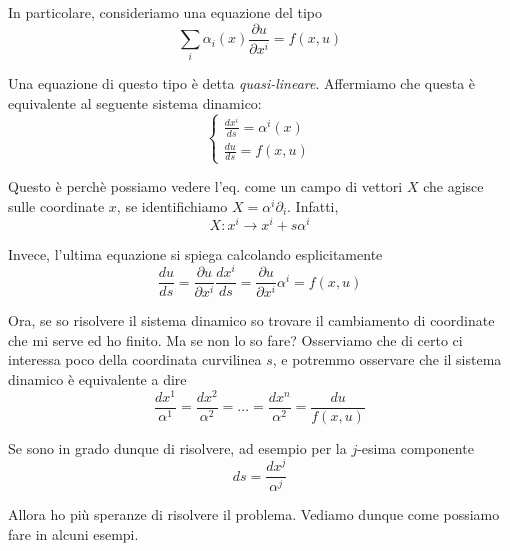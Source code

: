 \documentclass{report}
\begin{document}
In particolare, consideriamo una equazione del tipo 
\begin{equation}
    \sum_i \alpha_i(x)\frac{\partial u}{\partial x^i} = f(x, u)
\end{equation}

Una equazione di questo tipo è detta \emph{quasi-lineare}. Affermiamo che questa è equivalente al seguente sistema dinamico: 
\[\begin{cases}
    \frac{dx^i}{ds} = \alpha^i(x) \\ \frac{du}{ds} = f(x, u)
\end{cases}\]

Questo è perchè possiamo vedere l'eq. come un campo di vettori $X$ che agisce sulle coordinate $x$, se identifichiamo $X = \alpha^i\partial_i$. Infatti, 
\begin{equation}
    X: x^i \rightarrow x^i +s\alpha^i
\end{equation}

Invece, l'ultima equazione si spiega calcolando esplicitamente
\begin{equation}
    \frac{du}{ds} = \frac{\partial u}{\partial x^i} \frac{dx^i}{ds} = \frac{\partial u}{\partial x^i}\alpha^i = f(x, u) 
\end{equation}

Ora, se so risolvere il sistema dinamico so trovare il cambiamento di coordinate che mi serve ed ho finito. Ma se non lo so fare? Osserviamo che di certo ci interessa poco della coordinata curvilinea $s$, e potremmo osservare che il sistema dinamico è equivalente a dire 
\begin{equation}
    \frac{dx^1}{\alpha^1} = \frac{dx^2}{\alpha^2} = ... = \frac{dx^n}{\alpha^2} = \frac{du}{f(x, u)}
\end{equation}

Se sono in grado dunque di risolvere, ad esempio per la $j$-esima componente
\begin{equation}
    ds = \frac{dx^j}{\alpha^j}
\end{equation}

Allora ho più speranze di risolvere il problema. Vediamo dunque come possiamo fare in alcuni esempi.

\vspace{1cm}
\end{document}
